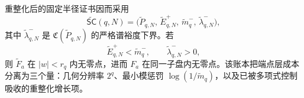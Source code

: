 重整化后的固定半径证书因而采用
\[
\widetilde{\mathsf{SC}}(q,N)
=
\bigl(\widetilde P_{q,N},\,\widetilde E_{q,N}^+,\,\widetilde m_q^-,\,\widetilde\lambda_{q,N}^-\bigr),
\]
其中 \(\widetilde\lambda_{q,N}^-\) 是
\(\mathfrak C(\widetilde P_{q,N})\) 的严格谱裕度下界。若
\[
\widetilde E_{q,N}^+<\widetilde m_q^-,
\qquad
\widetilde\lambda_{q,N}^->0,
\]
则 \(\widetilde F_a\) 在 \(|w|<r_q\) 内无零点，进而 \(F_a\) 在同一子盘内无零点。该账本把端点层成本分离为三个量：几何分辨率 \(2^q\)、最小模惩罚 \(\log(1/\widetilde m_q)\)，以及已被多项式控制吸收的重整化增长项。
